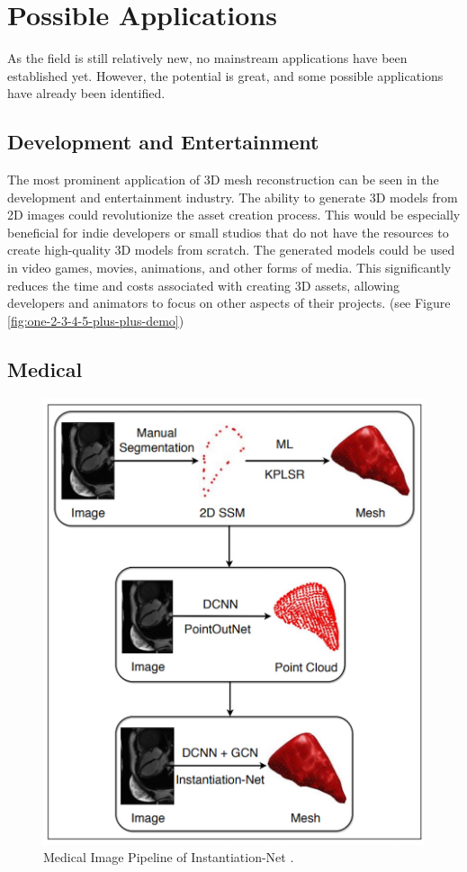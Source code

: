 \section{Possible Applications}
As the field is still relatively new, no mainstream applications have been established yet. However, the potential is great, and some possible applications have already been identified.

\subsection{Development and Entertainment}
The most prominent application of 3D mesh reconstruction can be seen in the development and entertainment industry. The ability to generate 3D models from 2D images could revolutionize the asset creation process.
This would be especially beneficial for indie developers or small studios that do not have the resources to create high-quality 3D models from scratch. The generated models could be used in video games, movies, animations, and other forms of media. This significantly reduces the time and costs associated with creating 3D assets, allowing developers and animators to focus on other aspects of their projects. (see Figure \ref{fig:one-2-3-4-5-plus-plus-demo})

\subsection{Medical}
\begin{figure}
    \centering
    \includegraphics[width=0.7\linewidth]{images/medical.jpg}
    \caption{Medical Image Pipeline of Instantiation-Net \autocite{wang_instantiation-net_2019}.}
    \label{fig:medical}
\end{figure}

